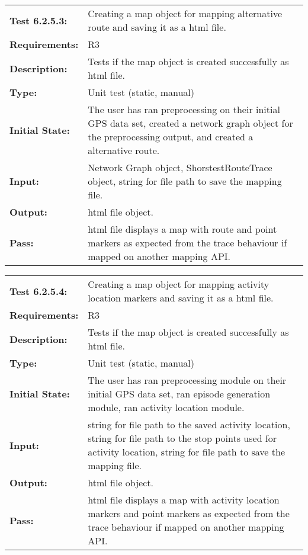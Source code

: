 \documentclass[12pt, titlepage]{article}
\begin{document}
{\begin{tabular}{|l|p{10cm}|}
    \hline
\end{tabular}
\begin{tabular}{|l|p{10cm}|}
    \hline
    \bf{Test} 6.2.5.3: & Creating a map object for mapping alternative route and saving it as a html file.\\
    \bf{Requirements}: &  R3\\
    \bf{Description}: & Tests if the map object is created successfully as html file. \\
    \bf{Type}: & Unit test (static, manual) \\
    \bf{Initial State}: & The user has ran preprocessing on their initial GPS data set, created a network graph object for the preprocessing output, and created a alternative route. \\
    \bf{Input}: & Network Graph object, ShorstestRouteTrace object, string for file path to save the mapping file. \\
    \bf{Output}: & html file object. \\
    \bf{Pass}: & html file displays a map with route and point markers as expected from the trace behaviour if mapped on another mapping API. \\
    \hline
\end{tabular}
\begin{tabular}{|l|p{10cm}|}
    \hline
    \bf{Test} 6.2.5.4: & Creating a map object for mapping activity location markers and saving it as a html file.\\
    \bf{Requirements}: &  R3\\
    \bf{Description}: & Tests if the map object is created successfully as html file. \\
    \bf{Type}: & Unit test (static, manual) \\
    \bf{Initial State}: & The user has ran preprocessing module on their initial GPS data set, ran episode generation module, ran activity location module. \\
    \bf{Input}: & string for file path to the saved activity location, string for file path to the stop points used for activity location, string for file path to save the mapping file. \\
    \bf{Output}: & html file object. \\
    \bf{Pass}: & html file displays a map with activity location markers and point markers as expected from the trace behaviour if mapped on another mapping API. \\
    \hline
\end{tabular}
\begin{tabular}{|l|p{10cm}|}

\end{tabular}}
\end{document}
